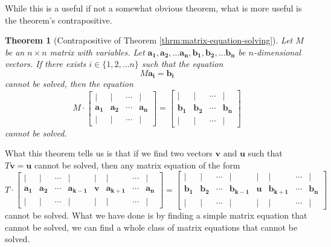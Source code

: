 \documentclass[a4paper,10pt]{article}
\theoremstyle{plain}
\newtheorem{Theorem}{Theorem}
\theoremstyle{definition}
\theoremstyle{remark}
\renewcommand{\vec}[1]{\mathbf{#1}}
\begin{document}
\noindent While this is a useful if not a somewhat obvious theorem, what is more useful is the theorem's contrapositive.
\begin{Theorem}[Contrapositive of Theorem \ref{thrm:matrix-equation-solving}]
	Let \( M \) be an \( n \times n \) matrix with variables.
	Let \( \vec{a_1}, \vec{a_2}, \dots \vec{a_n}, \vec{b_1}, \vec{b_2}, \dots \vec{b_n} \) be \( n \)-dimensional vectors.
	If there exists \( i \in \{1, 2, \dots n\} \) such that the equation \[M\vec{a_i} = \vec{b_i}\] cannot be solved,
	then the equation \[
	M
	\cdot
	\begin{bmatrix}
		| & | & \cdots & |\\
		\vec{a_1} & \vec{a_2} & \cdots & \vec{a_n} \\
		| & | & \cdots & |
	\end{bmatrix}
	=
	\begin{bmatrix}
		| & | & \cdots & |\\
		\vec{b_1} & \vec{b_2} & \cdots & \vec{b_n} \\
		| & | & \cdots & |
	\end{bmatrix}
	\]
	cannot be solved.
\end{Theorem}
What this theorem tells us is that if we find two vectors \( \vec{v} \text{ and } \vec{u} \) such that \( T\vec{v} = \vec{u} \) cannot be solved,
then any matrix equation of the form \[
	T
	\cdot
	\begin{bmatrix}
		| & | & \cdots & | & | & | & \cdots & |\\
		\vec{a_1} & \vec{a_2} & \cdots & \vec{a_{k-1}} & \vec{v} & \vec{a_{k+1}} & \cdots & \vec{a_n} \\
		| & | & \cdots & | & | & | & \cdots & |
	\end{bmatrix}
	=
	\begin{bmatrix}
		| & | & \cdots & | & | & | & \cdots & |\\
		\vec{b_1} & \vec{b_2} & \cdots & \vec{b_{k-1}} & \vec{u} & \vec{b_{k+1}} & \cdots & \vec{b_n} \\
		| & | & \cdots & | & | & | & \cdots & |
	\end{bmatrix}
\]
cannot be solved.
What we have done is by finding a simple matrix equation that cannot be solved, we can find a whole class of matrix equations that cannot be solved.

\end{document}
